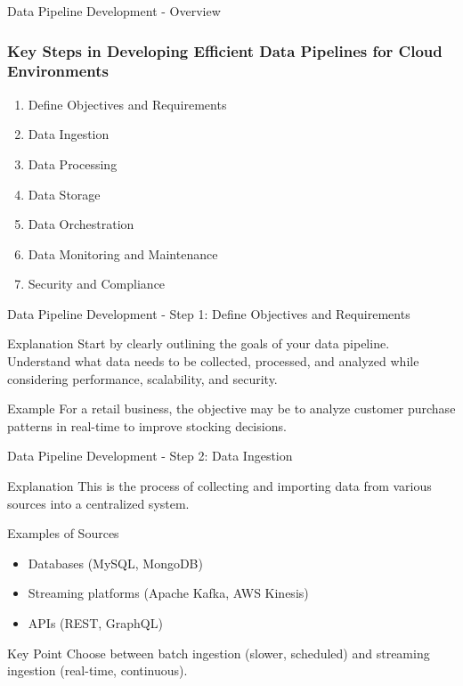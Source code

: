 \documentclass[aspectratio=169]{beamer}
\begin{document}
\begin{frame}[fragile]{Data Pipeline Development - Overview}
    \frametitle{Key Steps in Developing Efficient Data Pipelines for Cloud Environments}
    \begin{enumerate}
        \item Define Objectives and Requirements
        \item Data Ingestion
        \item Data Processing
        \item Data Storage
        \item Data Orchestration
        \item Data Monitoring and Maintenance
        \item Security and Compliance
    \end{enumerate}
\end{frame}

\begin{frame}[fragile]{Data Pipeline Development - Step 1: Define Objectives and Requirements}
    \begin{block}{Explanation}
        Start by clearly outlining the goals of your data pipeline. Understand what data needs to be collected, processed, and analyzed while considering performance, scalability, and security. 
    \end{block}
    
    \begin{block}{Example}
        For a retail business, the objective may be to analyze customer purchase patterns in real-time to improve stocking decisions.
    \end{block}
\end{frame}

\begin{frame}[fragile]{Data Pipeline Development - Step 2: Data Ingestion}
    \begin{block}{Explanation}
        This is the process of collecting and importing data from various sources into a centralized system.
    \end{block}
    
    \begin{block}{Examples of Sources}
        \begin{itemize}
            \item Databases (MySQL, MongoDB)
            \item Streaming platforms (Apache Kafka, AWS Kinesis)
            \item APIs (REST, GraphQL)
        \end{itemize}
    \end{block}
    
    \begin{block}{Key Point}
        Choose between batch ingestion (slower, scheduled) and streaming ingestion (real-time, continuous).
    \end{block}
\end{frame}
\end{document}
